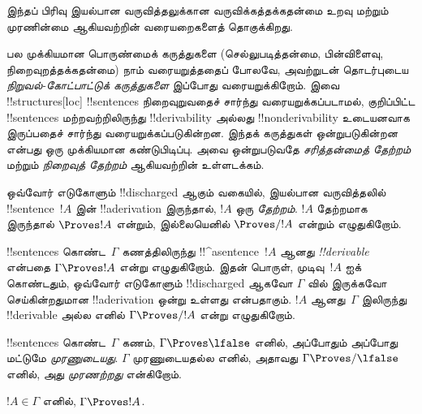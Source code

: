 \documentclass[../../../include/open-logic-section]{subfiles}
\begin{document}
      {}
      {}


\begin{editorial}
இந்தப் பிரிவு இயல்பான வருவித்தலுக்கான வருவிக்கத்தக்கதன்மை உறவு மற்றும்
முரணின்மை ஆகியவற்றின் வரையறைகளைத் தொகுக்கிறது.
\end{editorial}

\begin{explain}
பல முக்கியமான பொருண்மைக் கருத்துகளை (செல்லுபடித்தன்மை, பின்விளைவு,
நிறைவுறத்தக்கதன்மை) நாம் வரையறுத்ததைப் போலவே, அவற்றுடன் தொடர்புடைய
\emph{நிறுவல்-கோட்பாட்டுக் கருத்துகளை} இப்போது வரையறுக்கிறோம். இவை
!!{structure}s[loc] !!{sentence}s நிறைவுறுவதைச் சார்ந்து வரையறுக்கப்படாமல்,
குறிப்பிட்ட !!{sentence}s மற்றவற்றிலிருந்து !!{derivability} அல்லது
!!{nonderivability} உடையனவாக இருப்பதைச் சார்ந்து வரையறுக்கப்படுகின்றன.
இந்தக் கருத்துகள் ஒன்றுபடுகின்றன என்பது ஒரு முக்கியமான கண்டுபிடிப்பு. அவை
ஒன்றுபடுவதே \emph{சரித்தன்மைத் தேற்றம்} மற்றும் \emph{நிறைவுத் தேற்றம்}
ஆகியவற்றின் உள்ளடக்கம்.
\end{explain}

\begin{defn}[தேற்றங்கள்]
ஒவ்வோர் எடுகோளும் !!{discharged} ஆகும் வகையில், இயல்பான வருவித்தலில்
!!{sentence}~$!A$ இன் !!a{derivation} இருந்தால், $!A$ ஒரு \emph{தேற்றம்}.
$!A$ தேற்றமாக இருந்தால் $
\Proves !A$ என்றும், இல்லையெனில் $\Proves/ !A$ என்றும் எழுதுகிறோம்.
\end{defn}

\begin{defn}[!!^{derivability}]
!!{sentence}s கொண்ட~$\Gamma$ கணத்திலிருந்து !!^a{sentence}~$!A$ ஆனது
\emph{!!{derivable}} என்பதை $\Gamma \Proves !A$ என்று எழுதுகிறோம். இதன்
பொருள், முடிவு~$!A$ ஐக் கொண்டதும், ஒவ்வோர் எடுகோளும் !!{discharged} ஆகவோ
$\Gamma$ வில் இருக்கவோ செய்கின்றதுமான !!a{derivation} ஒன்று உள்ளது என்பதாகும்.
$!A$ ஆனது~$\Gamma$ இலிருந்து !!{derivable} அல்ல எனில் $\Gamma \Proves/ !A$
என்று எழுதுகிறோம்.
\end{defn}

\begin{defn}[முரணின்மை]
!!{sentence}s கொண்ட~$\Gamma$ கணம், $\Gamma \Proves \lfalse$ எனில், அப்போதும்
அப்போது மட்டுமே \emph{முரணுடையது}. $\Gamma$ முரணுடையதல்ல எனில், அதாவது
$\Gamma \Proves/ \lfalse$ எனில், அது \emph{முரணற்றது} என்கிறோம்.
\end{defn}

\begin{prop}[தற்சுட்டுப் பண்பு]
$!A \in \Gamma$ எனில், $\Gamma \Proves !A$.
\end{prop}
\end{document}

